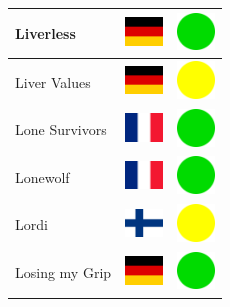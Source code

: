 \documentclass[12pt, a4paper, twoside]{report}
\begin{document}
\begin{center}
\begin{longtable}{|p{5cm}|p{2cm}|p{2cm}|}
 Liverless                                                  & \includegraphics[width=1cm]{../img/flags/de} &   \includegraphics[width=1cm]{../likes/y} \\ \hline
 Liver Values                                               & \includegraphics[width=1cm]{../img/flags/de} &   \includegraphics[width=1cm]{../likes/m} \\ \hline
 Lone Survivors                                             & \includegraphics[width=1cm]{../img/flags/fr} &   \includegraphics[width=1cm]{../likes/y} \\ \hline
 Lonewolf                                                   & \includegraphics[width=1cm]{../img/flags/fr} &   \includegraphics[width=1cm]{../likes/y} \\ \hline
 Lordi                                                      & \includegraphics[width=1cm]{../img/flags/fi} &   \includegraphics[width=1cm]{../likes/m} \\ \hline
 Losing my Grip                                             & \includegraphics[width=1cm]{../img/flags/de} &   \includegraphics[width=1cm]{../likes/y} \\ \hline

\end{longtable}
\end{center}
\end{document}
